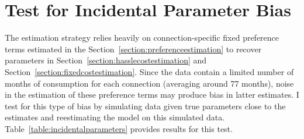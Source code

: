 \documentclass[12pt]{article}
\begin{document}
\begin{appendices}
\begin{figure}
\begin{turn}{90}
{
}
\end{turn}
\end{figure}


\section{Test for Incidental Parameter Bias}\label{appendix:incidentalparametertest}

The estimation strategy relies heavily on connection-specific fixed preference terms estimated in the Section~\ref{section:preferenceestimation} to recover parameters in Section~\ref{section:hasslecostestimation} and Section~\ref{section:fixedcostestimation}.  Since the data contain a limited number of months of consumption for each connection (averaging around 77 months), noise in the estimation of these preference terms may produce bias in latter estimates.  I test for this type of bias by simulating data given true parameters close to the estimates and reestimating the model on this simulated data.  Table~\ref{table:incidentalparameters} provides results for this test.  


\end{appendices}
\end{document}

